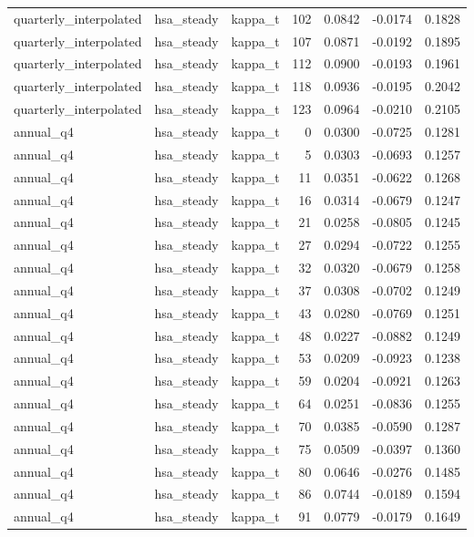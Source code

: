 \begin{tabular}{lllrrrr}
quarterly\_interpolated & hsa\_steady & kappa\_t & 102 & 0.0842 & -0.0174 & 0.1828 \\
quarterly\_interpolated & hsa\_steady & kappa\_t & 107 & 0.0871 & -0.0192 & 0.1895 \\
quarterly\_interpolated & hsa\_steady & kappa\_t & 112 & 0.0900 & -0.0193 & 0.1961 \\
quarterly\_interpolated & hsa\_steady & kappa\_t & 118 & 0.0936 & -0.0195 & 0.2042 \\
quarterly\_interpolated & hsa\_steady & kappa\_t & 123 & 0.0964 & -0.0210 & 0.2105 \\
annual\_q4 & hsa\_steady & kappa\_t & 0 & 0.0300 & -0.0725 & 0.1281 \\
annual\_q4 & hsa\_steady & kappa\_t & 5 & 0.0303 & -0.0693 & 0.1257 \\
annual\_q4 & hsa\_steady & kappa\_t & 11 & 0.0351 & -0.0622 & 0.1268 \\
annual\_q4 & hsa\_steady & kappa\_t & 16 & 0.0314 & -0.0679 & 0.1247 \\
annual\_q4 & hsa\_steady & kappa\_t & 21 & 0.0258 & -0.0805 & 0.1245 \\
annual\_q4 & hsa\_steady & kappa\_t & 27 & 0.0294 & -0.0722 & 0.1255 \\
annual\_q4 & hsa\_steady & kappa\_t & 32 & 0.0320 & -0.0679 & 0.1258 \\
annual\_q4 & hsa\_steady & kappa\_t & 37 & 0.0308 & -0.0702 & 0.1249 \\
annual\_q4 & hsa\_steady & kappa\_t & 43 & 0.0280 & -0.0769 & 0.1251 \\
annual\_q4 & hsa\_steady & kappa\_t & 48 & 0.0227 & -0.0882 & 0.1249 \\
annual\_q4 & hsa\_steady & kappa\_t & 53 & 0.0209 & -0.0923 & 0.1238 \\
annual\_q4 & hsa\_steady & kappa\_t & 59 & 0.0204 & -0.0921 & 0.1263 \\
annual\_q4 & hsa\_steady & kappa\_t & 64 & 0.0251 & -0.0836 & 0.1255 \\
annual\_q4 & hsa\_steady & kappa\_t & 70 & 0.0385 & -0.0590 & 0.1287 \\
annual\_q4 & hsa\_steady & kappa\_t & 75 & 0.0509 & -0.0397 & 0.1360 \\
annual\_q4 & hsa\_steady & kappa\_t & 80 & 0.0646 & -0.0276 & 0.1485 \\
annual\_q4 & hsa\_steady & kappa\_t & 86 & 0.0744 & -0.0189 & 0.1594 \\
annual\_q4 & hsa\_steady & kappa\_t & 91 & 0.0779 & -0.0179 & 0.1649 \\

\end{tabular}
